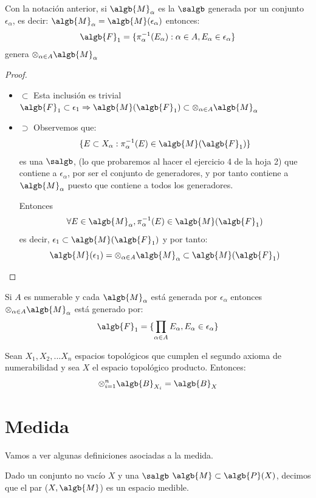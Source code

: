 \documentclass{apuntes}
\begin{document}
\begin{prop}
Con la notación anterior, si $\algb{M}_\alpha$ es la $\salgb$ generada por un conjunto $\epsilon_\alpha$, es decir: $\algb{M}_\alpha = \algb{M}(\epsilon_\alpha)$ entonces:
\[\algb{F}_1= \{\pi^{-1}_\alpha(E_\alpha): \alpha \in A, E_\alpha \in \epsilon_\alpha\}\]
genera $\otimes_{\alpha\in A}\algb{M}_\alpha$
\end{prop}
\begin{proof}
\begin{itemize}
\item $\subset$
Esta inclusión es trivial
$\algb{F}_1 \subset \epsilon_1 \Rightarrow \algb{M}(\algb{F}_1) \subset \otimes_{\alpha\in A}\algb{M}_\alpha$
\item $\supset$
Observemos que:
\[\{E \subset X_\alpha: \pi^{-1}_\alpha(E)\in \algb{M}(\algb{F}_1)\}\]
es una $\salgb$, (lo que probaremos al hacer el ejercicio 4 de la hoja 2) que contiene a $\epsilon_\alpha$, por ser el conjunto de generadores, y por tanto contiene a $\algb{M}_\alpha$ puesto que contiene a todos los generadores.

Entonces
\[\forall E  \in \algb{M}_\alpha, \pi^{-1}_\alpha(E) \in \algb{M}(\algb{F}_1)\]
es decir, $\epsilon_1 \subset \algb{M}(\algb{F}_1)$ y por tanto:
\[\algb{M}(\epsilon_1)=\otimes_{\alpha\in A}\algb{M}_\alpha \subset \algb{M}(\algb{F}_1)\]
\end{itemize}
\end{proof}

\begin{corol}
Si $A$ es numerable y cada $\algb{M}_\alpha$ está generada por $\epsilon_\alpha$ entonces $\otimes_{\alpha\in A}\algb{M}_\alpha$ está generado por:
\[\algb{F}_1 = \{\prod_{\alpha\in A}E_\alpha, E_\alpha \in \epsilon_\alpha\}\]
\end{corol}


\begin{prop}
Sean $X_1, X_2, ...X_n$ espacios topológicos que cumplen el segundo axioma de numerabilidad y sea $X$ el espacio topológico producto. Entonces:
\[\otimes_{i=1}^n \algb{B}_{X_i} = \algb{B}_X\]

\end{prop}

\section{Medida}
Vamos a ver algunas definiciones asociadas a la medida.

\begin{defn}
Dado un conjunto no vacío $X$ y una $\salgb$ $\algb{M} \subset \algb{P}(X)$, decimos que el par ($X, \algb{M}$) es un espacio medible.
\end{defn}
\end{document}
